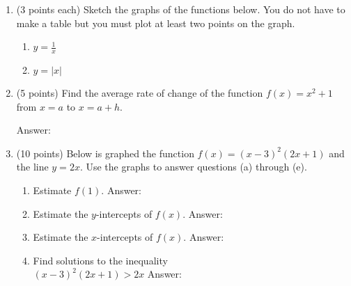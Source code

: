 \documentclass[12pt]{article}
\begin{document}
\begin{enumerate}
\item (3 points each) Sketch the graphs of the functions below. You do not have to make a table but you must plot at least two points on the graph.
\begin{enumerate}
\item $y=\frac{1}{x}$
\begin{center}
\end{center}
\vfill
\item $y=\vert x \vert$
\begin{center}
\end{center}
\end{enumerate}
\newpage
\item (5 points) Find the average rate of change of the function $f(x)=x^2+1$ from $x=a$ to $x=a+h.$
\begin{flushright}{ Answer:\underline{\hspace{2in}}}\end{flushright}
\vfill
\item (10 points) Below is graphed the function $f(x)=(x-3)^2(2x+1)$ and the line $y=2x.$ Use the graphs to answer questions (a) through (e).

\begin{enumerate}
\item Estimate $f(1).$ \hfill { Answer:\underline{\hspace{2in}}}
\vspace{.2in}
\item Estimate the $y$-intercepts of $f(x)$.\hfill{ Answer:\underline{\hspace{2in}}}
\vspace{.2in}
\item Estimate the $x$-intercepts of $f(x)$.\hfill{ Answer:\underline{\hspace{2in}}}
\item Find solutions to the inequality \\
$(x-3)^2(2x+1)>2x $
\hfill Answer:\underline{\hspace{2in}}


\end{enumerate}
\end{enumerate}
\end{document}
